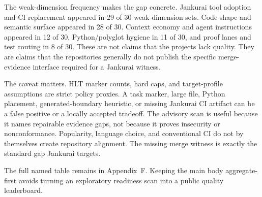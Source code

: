 \PublicRepoWeakDimensionTable

The weak-dimension frequency makes the gap concrete. Jankurai tool adoption and CI replacement appeared in 29 of 30 weak-dimension sets. Code shape and semantic surface appeared in 28 of 30. Context economy and agent instructions appeared in 12 of 30, Python/polyglot hygiene in 11 of 30, and proof lanes and test routing in 8 of 30. These are not claims that the projects lack quality. They are claims that the repositories generally do not publish the specific merge-evidence interface required for a Jankurai witness.

The caveat matters. HLT marker counts, hard caps, and target-profile assumptions are strict policy proxies. A task marker, large file, Python placement, generated-boundary heuristic, or missing Jankurai CI artifact can be a false positive or a locally accepted tradeoff. The advisory scan is useful because it names repairable evidence gaps, not because it proves insecurity or nonconformance. Popularity, language choice, and conventional CI do not by themselves create repository alignment. The missing merge witness is exactly the standard gap Jankurai targets.

The full named table remains in Appendix~F. Keeping the main body aggregate-first avoids turning an exploratory readiness scan into a public quality leaderboard.
